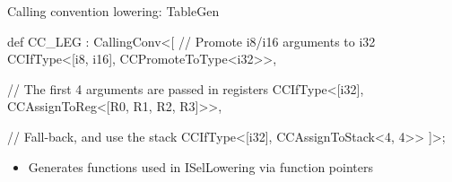 
\begin{frame}[fragile]{Calling convention lowering: TableGen}

\begin{codebox}
def CC_LEG : CallingConv<[
    // Promote i8/i16 arguments to i32
    CCIfType<[i8, i16], CCPromoteToType<i32>>,

    // The first 4 arguments are passed in registers
    CCIfType<[i32], CCAssignToReg<[R0, R1, R2, R3]>>,

    // Fall-back, and use the stack
    CCIfType<[i32], CCAssignToStack<4, 4>>
  ]>;
\end{codebox}

\begin{itemize}
    \item Generates functions used in ISelLowering via function pointers
\end{itemize}

\end{frame}


